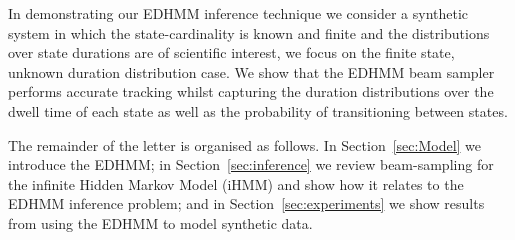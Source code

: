 In demonstrating our EDHMM inference technique we consider a synthetic system  in which the state-cardinality is known and finite and the distributions over state durations are of scientific interest, we focus on the finite state, unknown duration distribution case. We show that the EDHMM beam sampler performs accurate tracking whilst capturing the duration distributions over the dwell time of each state as well as the probability of transitioning between states.

The remainder of the letter is organised as follows.  In Section~\ref{sec:Model} we introduce the EDHMM; in Section~\ref{sec:inference} we review beam-sampling for the infinite Hidden Markov Model (iHMM) \cite{Beal2002} and show how it relates to the EDHMM inference problem; and in Section~\ref{sec:experiments} we show results from using the EDHMM to model synthetic data.  
